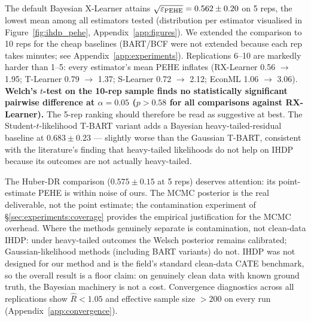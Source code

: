 The default Bayesian X-Learner attains $\sqrt{\varepsilon_{\mathrm{PEHE}}} = 0.562 \pm 0.20$ on
5 reps, the lowest mean among all estimators tested
(distribution per estimator visualised in
Figure~\ref{fig:ihdp_pehe}, Appendix~\ref{app:figures}). We extended
the comparison to 10 reps for the cheap baselines (BART/BCF were
not extended because each rep takes minutes; see
Appendix~\ref{app:experiments}). Replications 6--10 are markedly
harder than 1--5: every estimator's mean PEHE inflates (RX-Learner
0.56 $\to$ 1.95; T-Learner 0.79 $\to$ 1.37; S-Learner 0.72 $\to$ 2.12;
EconML 1.06 $\to$ 3.06). \textbf{Welch's $t$-test on the 10-rep
sample finds no statistically significant pairwise difference at
$\alpha = 0.05$ ($p > 0.58$ for all comparisons against RX-Learner).}
The 5-rep ranking should therefore be read as suggestive at best.
The Student-$t$-likelihood T-BART variant adds a Bayesian
heavy-tailed-residual baseline at $0.683 \pm 0.23$ --- slightly
worse than the Gaussian T-BART, consistent with the literature's
finding that heavy-tailed likelihoods do not help on IHDP because
its outcomes are not actually heavy-tailed.

The Huber-DR comparison ($0.575 \pm 0.15$ at 5 reps) deserves
attention: its point-estimate PEHE is within noise of ours. The
MCMC posterior is the real deliverable, not the point estimate;
the contamination experiment of
\S\ref{sec:experiments:coverage} provides the empirical
justification for the MCMC overhead. Where the methods genuinely
separate is contamination, not clean-data IHDP: under heavy-tailed
outcomes the Welsch posterior remains calibrated; Gaussian-likelihood
methods (including BART variants) do not. IHDP was not designed for our method and is the
field's standard clean-data CATE benchmark, so the overall result
is a floor claim: on genuinely clean data with known ground truth,
the Bayesian machinery is not a cost. Convergence diagnostics across
all replications show $\hat{R} < 1.05$ and effective sample size
$> 200$ on every run (Appendix~\ref{app:convergence}).

